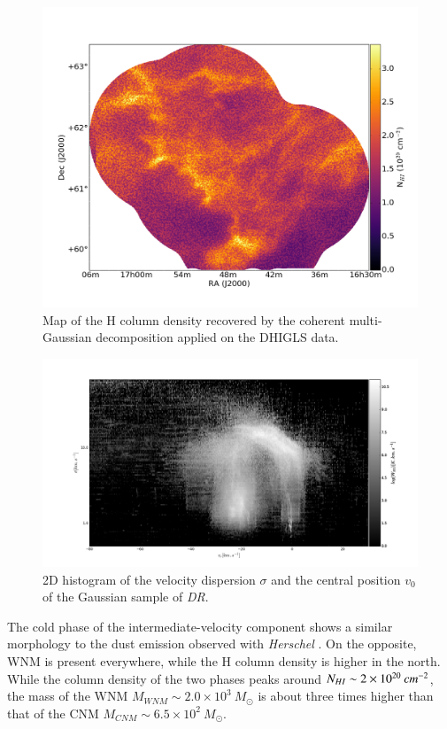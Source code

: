 \documentclass[traditabstract]{aa}
\begin{document}
\begin{figure}[h!]
  \centering
  \includegraphics[width=0.8\linewidth,trim=45 55 65 105,clip=true]{Figures/DHIGLS_NHI_tot.png}
  \caption{\label{NHI_DHIGLS} Map of the H column density recovered by the coherent multi-Gaussian decomposition applied on the DHIGLS data.}
\end{figure}
 
\begin{figure}
  \centering
  \includegraphics[width=0.7\linewidth,trim=105 30 75 70,clip=true]{Figures/heatmap_png.png}
  \caption{\label{fig::heatmap} 2D histogram of the velocity dispersion $\sigma$ and the central position $v_0$ of the Gaussian sample of \textit{DR}.}
\end{figure}

   The cold phase of the intermediate-velocity component shows a similar morphology to the dust emission observed with \emph{Herschel} \citep{MAMD_2017b}. On the opposite, WNM is present everywhere, while the H column density is higher in the north. While the column density of the two phases peaks around $N_{H\rmnum{1}}\sim 2\times 10^{20}\: cm^{-2}$, the mass of the WNM $M_{WNM}\sim 2.0\times 10^3\: M_\odot$ is about three times higher than that of the CNM $M_{CNM}\sim 6.5\times 10^2\: M_\odot$.
\end{document}
